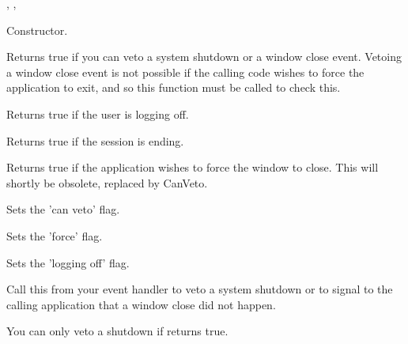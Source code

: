 ,\rtfsp
{},\rtfsp
{}


\label{wxcloseeventctor}


Constructor.

\label{wxcloseeventcanveto}


Returns true if you can veto a system shutdown or a window close event.
Vetoing a window close event is not possible if the calling code wishes to
force the application to exit, and so this function must be called to check this.

\label{wxcloseeventgetloggingoff}


Returns true if the user is logging off.

\label{wxcloseeventgetsessionending}


Returns true if the session is ending.

\label{wxcloseeventgetforce}


Returns true if the application wishes to force the window to close.
This will shortly be obsolete, replaced by CanVeto.

\label{wxcloseeventsetcanveto}


Sets the 'can veto' flag.

\label{wxcloseeventsetforce}


Sets the 'force' flag.

\label{wxcloseeventsetloggingoff}


Sets the 'logging off' flag.

\label{wxcloseeventveto}


Call this from your event handler to veto a system shutdown or to signal
to the calling application that a window close did not happen.

You can only veto a shutdown if  returns
true.


